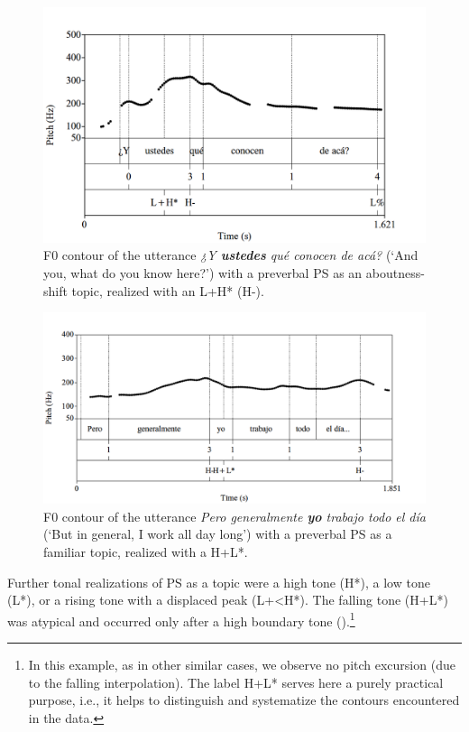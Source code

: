 \documentclass[output=paper]{langsci/langscibook}
\begin{document}
\begin{figure}[p]
\includegraphics[width=\textwidth]{figures/pes-img15.png}
\caption{F0 contour of the utterance \textit{¿Y \textbf{ustedes} qué conocen de acá?} (‘And you, what do you know here?’) with a preverbal PS as an aboutness-shift topic, realized with an L+H* (H-).\label{fig:pes:15}}
\end{figure}

\begin{figure}[p]
\includegraphics[width=\textwidth]{figures/pes-img16.png}
\caption{F0 contour of the utterance \textit{Pero generalmente \textbf{yo} trabajo todo el día} (‘But in general, I work all day long’) with a preverbal PS as a familiar topic, realized with a H+L*.\label{fig:pes:16}}
\end{figure}

Further tonal realizations of PS as a topic were a high tone (H*), a low tone (L*), or a rising tone with a displaced peak (L+<H*). The falling tone (H+L*) was atypical and occurred only after a high boundary tone ().\footnote{In this example, as in other similar cases, we observe no pitch excursion (due to the falling interpolation). The label H+L* serves here a purely practical purpose, i.e., it helps to distinguish and systematize the contours encountered in the data.}\largerpage[2]
\end{document}
